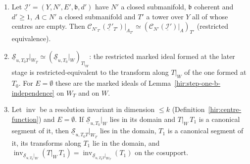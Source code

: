 \begin{theorem}
\label{mc:contact-stage-rebase}
\leanok
\begin{enumerate}
\item Let \(\underline{\mathcal I}'=(Y,N',E',\mathfrak b,d')\) have \(N'\) a closed submanifold, \(\mathfrak b\) coherent and \(d'\ge1\), \(A\subset N'\) a closed submanifold and \(T'\) a
tower over \(Y\) all of whose centres are empty. Then \(\mathcal C_{N'_{T'}}(\underline{\mathcal I}'_{T'})|_{A_{T'}}\simeq(\mathcal C_{N'}(\underline{\mathcal I}')|_A)_{T'}\) (restricted
equivalence).
\item \(\underline{\mathcal S}_{u,T_0T}|_{W_T}\simeq(\underline{\mathcal S}_{u,T_0}|_W)_{T|_W}\): the restricted marked ideal formed at the later stage is
restricted-equivalent to the transform along \(T|_W\) of the one formed at \(T_0\). For \(E=\emptyset\) these are the marked ideals of
Lemma~\ref{hir:step-one-b-independence} on \(W_T\) and on \(W\).
\item Let \(\operatorname{inv}\) be a resolution invariant in dimension \(\le k\) (Definition~\ref{hir:centre-function}) and \(E=\emptyset\). If
\(\underline{\mathcal S}_{u,T_0}|_W\) lies in its domain and \(T|_W\,T_1\) is a canonical segment of it, then \(\underline{\mathcal S}_{u,T_0T}|_{W_T}\) lies in the domain,
\(T_1\) is a canonical segment of it, its transforms along \(T_1\) lie in the domain, and
\(\operatorname{inv}_{\underline{\mathcal S}_{u,T_0}|_W}(T|_W\,T_1)=\operatorname{inv}_{\underline{\mathcal S}_{u,T_0T}|_{W_T}}(T_1)\) on the cosupport.
\end{enumerate}
\end{theorem}
